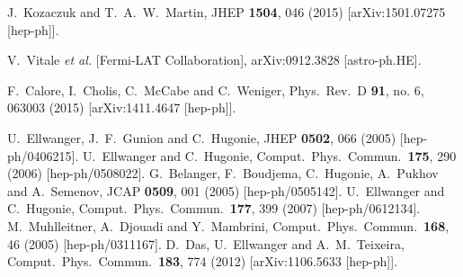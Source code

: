 \documentclass[preprintnumbers,superscriptaddress,nofootinbib,aps,prd,floatfix]{revtex4}
\begin{document}
\begin{thebibliography}{99}
  J.~Kozaczuk and T.~A.~W.~Martin,
  JHEP {\bf 1504}, 046 (2015)
  [arXiv:1501.07275 [hep-ph]].
 
  V.~Vitale {\it et al.} [Fermi-LAT Collaboration],
  arXiv:0912.3828 [astro-ph.HE].
 
  F.~Calore, I.~Cholis, C.~McCabe and C.~Weniger,
  Phys.\ Rev.\ D {\bf 91}, no. 6, 063003 (2015)
  [arXiv:1411.4647 [hep-ph]].
 
  U.~Ellwanger, J.~F.~Gunion and C.~Hugonie,
  JHEP {\bf 0502}, 066 (2005)
  [hep-ph/0406215].
  U.~Ellwanger and C.~Hugonie,
  Comput.\ Phys.\ Commun.\  {\bf 175}, 290 (2006)
  [hep-ph/0508022].
  G.~Belanger, F.~Boudjema, C.~Hugonie, A.~Pukhov and A.~Semenov,
  JCAP {\bf 0509}, 001 (2005)
  [hep-ph/0505142].
  U.~Ellwanger and C.~Hugonie,
  Comput.\ Phys.\ Commun.\  {\bf 177}, 399 (2007)
  [hep-ph/0612134].
  M.~Muhlleitner, A.~Djouadi and Y.~Mambrini,
  Comput.\ Phys.\ Commun.\  {\bf 168}, 46 (2005)
  [hep-ph/0311167].
  D.~Das, U.~Ellwanger and A.~M.~Teixeira,
  Comput.\ Phys.\ Commun.\  {\bf 183}, 774 (2012)
  [arXiv:1106.5633 [hep-ph]].


\end{thebibliography}
\end{document}
